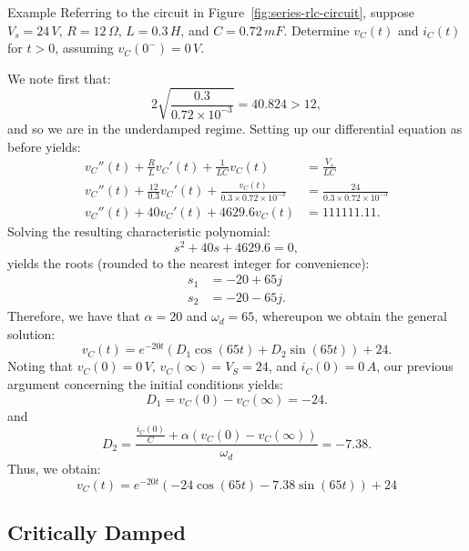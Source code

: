 \documentclass[twoside]{article}
\begin{document}
\begin{greenbox}{Example}
    Referring to the circuit in Figure~\ref{fig:series-rlc-circuit}, suppose $V_{s} = 24\,V$, $R = 12\,\Omega$, $L = 0.3\,H$, and $C = 0.72\,mF$. Determine $v_{C}(t)$ and $i_{C}(t)$ for $t > 0$, assuming $v_{C}(0^{-}) = 0\,V$.
\end{greenbox}

We note first that:
\[
    2\sqrt{\frac{0.3}{0.72 \times 10^{-3}}} = 40.824 > 12,
\]
and so we are in the underdamped regime. Setting up our differential equation as before yields:
\begin{align*}
    v_{C}''(t) + \frac{R}{L}v_{C}'(t) + \frac{1}{LC}v_{C}(t) &= \frac{V_{s}}{LC} \\
    v_{C}''(t) + \frac{12}{0.3}v_{C}'(t) + \frac{v_{C}(t)}{0.3 \times 0.72 \times 10^{-3}} &= \frac{24}{0.3 \times 0.72 \times 10^{-3}} \\
    v_{C}''(t) + 40 v_{C}'(t) + 4629.6 v_{C}(t) &= 111111.11.
\end{align*}
Solving the resulting characteristic polynomial:
\[
    s^{2} + 40 s + 4629.6 = 0,
\]
yields the roots (rounded to the nearest integer for convenience):
\begin{align*}
    s_{1} &= -20 + 65j \\
    s_{2} &= -20 - 65j.
\end{align*}
Therefore, we have that $\alpha = 20$ and $\omega_{d} = 65$, whereupon we obtain the general solution:
\[
    v_{C}(t) = e^{-20t}\left(D_{1}\cos(65 t) + D_{2}\sin(65 t)\right) + 24.
\]
Noting that $v_{C}(0) = 0\,V$, $v_{C}(\infty) = V_{S} = 24$, and $i_{C}(0) = 0\,A$, our previous argument concerning the initial conditions yields:
\[
    D_{1} = v_{C}(0) - v_{C}(\infty) = -24.
\]
and
\[
    D_{2} = \frac{\frac{i_{C}(0)}{C} + \alpha (v_{C}(0) - v_{C}(\infty))}{\omega_{d}} = -7.38.
\]
Thus, we obtain:
\[
    v_{C}(t) = e^{-20t}\left(-24\cos(65 t) - 7.38\sin(65 t)\right) + 24
\]

\subsection{Critically Damped}
\end{document}
